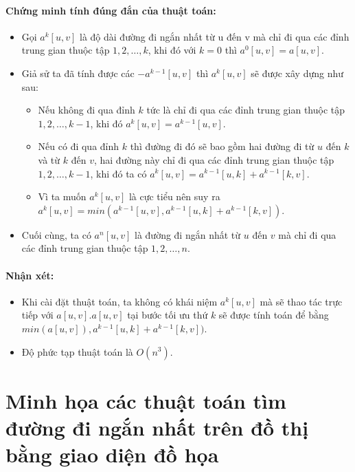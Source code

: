 \documentclass[a4paper,12pt]{report}
\begin{document}
    \subsubsection{Chứng minh tính đúng đắn của thuật toán:}
\begin{itemize}
	\item Gọi $ a^{k}[u, v] $ là độ dài đường đi ngắn nhất từ u đến v mà chỉ đi qua các đỉnh trung gian thuộc tập $ {1, 2, \ldots, k} $, khi đó với $ k = 0 $ thì $ a^{0}[u, v] = a[u, v] $.
	\item Giả sử ta đã tính được các $ - a^{k-1}[u, v] $ thì $ a^{k}[u, v] $ sẽ được xây dựng như sau:
	\begin{itemize}
	\item Nếu không đi qua đỉnh $k$ tức là chỉ đi qua các đỉnh trung gian thuộc tập $ {1, 2, \ldots, k-1} $, khi đó $ a^{k}[u, v] = a^{k-1}[u, v]  $.
	\item Nếu có đi qua đỉnh $k$ thì đường đi đó sẽ bao gồm hai đường đi từ $u$ đến $k$ và từ $k$ đến $v$, hai đường này chỉ đi qua các đỉnh trung gian thuộc tập $ {1, 2, \ldots, k-1} $, khi đó ta có $ a^{k}[u, v] = a^{k-1}[u, k] + a^{k-1}[k, v] $.
	\item Vì ta muốn $ a^{k}[u, v] $ là cực tiểu nên suy ra $ a^{k}[u, v] = min(a^{k-1}[u, v], a^{k-1}[u, k] + a^{k-1}[k, v]) $.
	\end{itemize} 
	\item Cuối cùng, ta có $ a^{n}[u, v] $ là đường đi ngắn nhất từ $u$ đến $v$ mà chỉ đi qua các đỉnh trung gian thuộc tập $ {1, 2, \ldots, n} $.

\end{itemize}

    \subsubsection{Nhận xét:}
\begin{itemize}
 \item Khi cài đặt thuật toán, ta không có khái niệm $ a^{k}[u, v] $ mà sẽ thao tác trực tiếp với $ a[u, v] $.$ a[u, v] $ tại bước tối ưu thứ $k$ sẽ được tính toán để bằng $ min(a[u, v]), a^{k-1}[u, k] + a^{k-1}[k, v]) $.
 \item Độ phức tạp thuật toán là $ O(n^{3}) $.

\end{itemize}

\chapter{Minh họa các thuật toán tìm đường đi ngắn nhất trên đồ thị bằng giao diện đồ họa}
\end{document}
